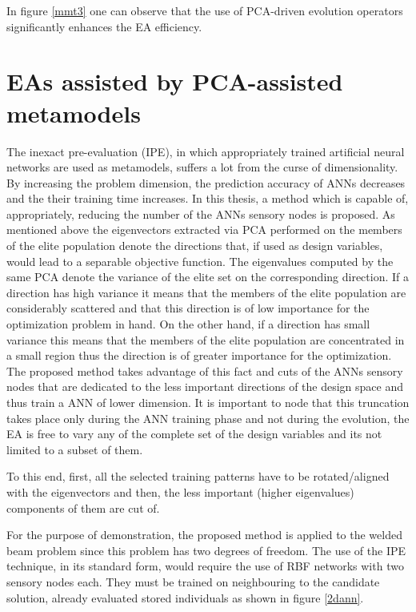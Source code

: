 In figure \ref{mmt3} one can observe that the use of PCA-driven evolution operators significantly enhances the EA efficiency.

\FloatBarrier
\section{EAs assisted by PCA-assisted metamodels}
The inexact pre-evaluation (IPE), in which appropriately trained artificial neural networks are used as metamodels, suffers a lot from the curse of dimensionality. By increasing the problem dimension, the prediction accuracy of ANNs decreases and the their training time increases. In this thesis, a method which is capable of, appropriately, reducing the number of the ANNs sensory nodes is proposed. As mentioned above the eigenvectors extracted via PCA performed on the members of the elite population denote the directions that, if used as design variables, would lead to a separable objective function. The eigenvalues computed by the same PCA denote the variance of the elite set on the corresponding direction. If a direction has high variance it means that the members of the elite population are considerably scattered and that this direction is of low importance for the optimization problem in hand. On the other hand, if a direction has small variance this means that the members of the elite population are concentrated in a small region thus the direction is of greater importance for the optimization.  The proposed method takes advantage of this fact and cuts of the ANNs sensory nodes that are dedicated to the less important directions of the design space and thus train a ANN of lower dimension. It is important to node that this truncation takes place only during the ANN training phase and not during the evolution, the EA is free to vary any of the complete set of the design variables and its not limited to a subset of them.        


To this end, first, all the selected training patterns have to be rotated/aligned with the eigenvectors and then, the less important (higher eigenvalues) components of them are cut of.    

For the purpose of demonstration, the proposed method is applied to the welded beam problem since this problem has two degrees of freedom. The use of the IPE technique, in its standard form, would require the use of RBF networks with two sensory nodes each. They must be trained on neighbouring to the candidate solution, already evaluated stored individuals as shown in figure \ref{2dann}. 
    
